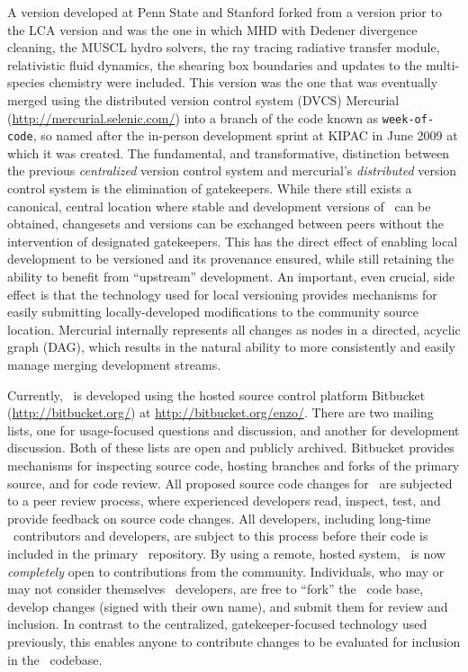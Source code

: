 A version developed at Penn State and Stanford forked from a version
prior to the LCA version and was the one in which MHD with Dedener
divergence cleaning, the MUSCL hydro solvers, the ray tracing
radiative transfer module, relativistic fluid dynamics, the shearing
box boundaries and updates to the multi-species chemistry were
included. This version was the one that was eventually merged using
the distributed version control system (DVCS) Mercurial
(\url{http://mercurial.selenic.com/}) into a branch of the code known
as \texttt{week-of-code}, so named after the in-person development
sprint at KIPAC in June 2009 at which it was created.  The
fundamental, and transformative, distinction between the previous
\textit{centralized} version control system and mercurial's
\textit{distributed} version control system is the elimination of
gatekeepers.  While there still exists a canonical, central location
where stable and development versions of \enzo\ can be obtained,
changesets and versions can be exchanged between peers without the
intervention of designated gatekeepers.  This has the direct effect of
enabling local development to be versioned and its provenance ensured,
while still retaining the ability to benefit from ``upstream''
development.  An important, even crucial, side effect is that the
technology used for local versioning provides mechanisms for easily
submitting locally-developed modifications to the community source
location.  Mercurial internally represents all changes as nodes in a
directed, acyclic graph (DAG), which results in the natural ability to
more consistently and easily manage merging development streams.

Currently, \enzo\ is developed using the hosted source control
platform Bitbucket (\url{http://bitbucket.org/}) at
\url{http://bitbucket.org/enzo/}.  There are two mailing lists, one
for usage-focused questions and discussion, and another for
development discussion.  Both of these lists are open and publicly
archived.  Bitbucket provides mechanisms for inspecting source code,
hosting branches and forks of the primary source, and for code review.
All proposed source code changes for \enzo\ are subjected to a peer
review process, where experienced developers read, inspect, test, and
provide feedback on source code changes.  All developers, including
long-time \enzo\ contributors and developers, are subject to this
process before their code is included in the primary \enzo\
repository.  By using a remote, hosted system, \enzo\ is now
\textit{completely} open to contributions from the community.
Individuals, who may or may not consider themselves \enzo\ developers,
are free to ``fork'' the \enzo\ code base, develop changes (signed
with their own name), and submit them for review and inclusion.  In
contrast to the centralized, gatekeeper-focused technology used
previously, this enables anyone to contribute changes to be evaluated
for inclusion in the \enzo\ codebase.

